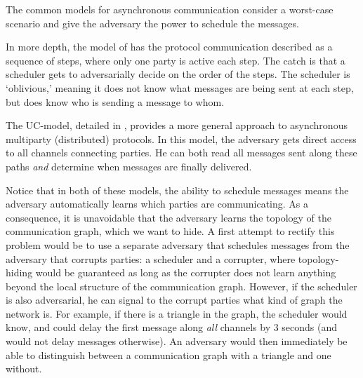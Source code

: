 
The common models for asynchronous communication 
\cite{STOC:BenCanGol93,FOCS:Canetti01} consider a worst-case scenario and give 
the adversary the power to schedule the messages.

In more depth, the model of \cite{STOC:BenCanGol93} has the protocol communication described as a sequence of steps, where only one party is active each step. The catch is that a scheduler gets to adversarially decide on the order of the steps. The scheduler is `oblivious,' meaning it does not know what messages are being sent at each step, but does know who is sending a message to whom.

The UC-model, detailed in \cite{FOCS:Canetti01}, provides a more general approach to asynchronous multiparty (distributed) protocols. In this model, the adversary gets direct access to all channels connecting parties. He can both read all messages sent along these paths \emph{and} determine when messages are finally delivered.

Notice that in both of these models, the ability to schedule messages means the adversary automatically learns which parties 
are communicating. As a consequence, it is unavoidable that the adversary 
learns the topology of the communication graph, which we want to hide. A first attempt to rectify this problem would be to use a separate adversary that schedules messages from the adversary that corrupts parties: a scheduler and a corrupter, where topology-hiding would be guaranteed as long as the corrupter does not learn anything beyond the local structure of the communication graph. However, if the scheduler is also adversarial, he can signal to the corrupt parties what kind of graph the network is. For example, if there is a triangle in the graph, the scheduler would know, and could delay the first message along \emph{all} channels by 3 seconds (and would not delay messages otherwise). An adversary would then immediately be able to distinguish between a communication graph with a triangle and one without.